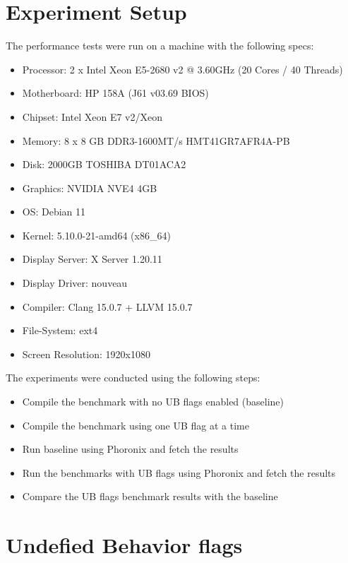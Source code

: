 \documentclass{sciposter}
\begin{document}
\begin{multicols}{3}
\section{Experiment Setup}
The performance tests were run on a machine with the following specs:
\begin{itemize}
\item Processor: 2 x Intel Xeon E5-2680 v2 @ 3.60GHz (20 Cores / 40 Threads)
\item Motherboard: HP 158A (J61 v03.69 BIOS)
\item Chipset: Intel Xeon E7 v2/Xeon
\item Memory: 8 x 8 GB DDR3-1600MT/s HMT41GR7AFR4A-PB
\item Disk: 2000GB TOSHIBA DT01ACA2
\item Graphics: NVIDIA NVE4 4GB
\item OS: Debian 11
\item Kernel: 5.10.0-21-amd64 (x86\_64)
\item Display Server: X Server 1.20.11
\item Display Driver: nouveau
\item Compiler: Clang 15.0.7 + LLVM 15.0.7
\item File-System: ext4
\item Screen Resolution: 1920x1080
\end{itemize}
\bigbreak
\bigbreak
The experiments were conducted using the following steps:
\begin{itemize}
\item Compile the benchmark with no UB flags enabled (baseline)
\item Compile the benchmark using one UB flag at a time
\item Run baseline using Phoronix and fetch the results
\item Run the benchmarks with UB flags using Phoronix and fetch the results
\item Compare the UB flags benchmark results with the baseline
\end{itemize}

\section{Undefied Behavior flags}


\end{multicols}
\end{document}
